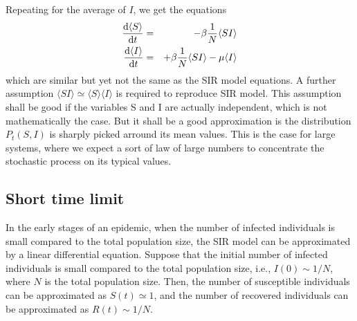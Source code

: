 Repeating for the average of $I$, we get the equations
\begin{eqnarray*}
 \frac{\mathrm{d} \langle S \rangle}{\mathrm{d} t}  &=& - \beta \frac 1 N \langle S I \rangle \\
  \frac{\mathrm{d} \langle I \rangle}{\mathrm{d} t}  &=& + \beta \frac 1 N \langle S I \rangle - \mu \langle I\rangle
\end{eqnarray*}
which are similar but yet not the same as the SIR model equations. A further assumption $\langle S I \rangle \simeq \langle S \rangle  \langle I \rangle $ is required to reproduce SIR model. This assumption shall be good if the variables S and I are actually independent, which is not mathematically the case. But it shall be a good approximation is the distribution $P_t(S,I)$ is sharply picked arround its mean values. This is the case for large systems, where we expect a sort of law of large numbers to concentrate the stochastic process on its typical values.


\subsection{Short time limit}

In the early stages of an epidemic, when the number of infected individuals is small compared to the total population size, the SIR model can be approximated by a linear differential equation. %
Suppose that the initial number of infected individuals is small compared to the total population size, i.e., $I(0) \sim 1/N$, where $N$ is the total population size. Then, the number of susceptible individuals can be approximated as $S(t) \simeq 1$, and the number of recovered individuals can be approximated as $R(t) \sim 1/N$.

